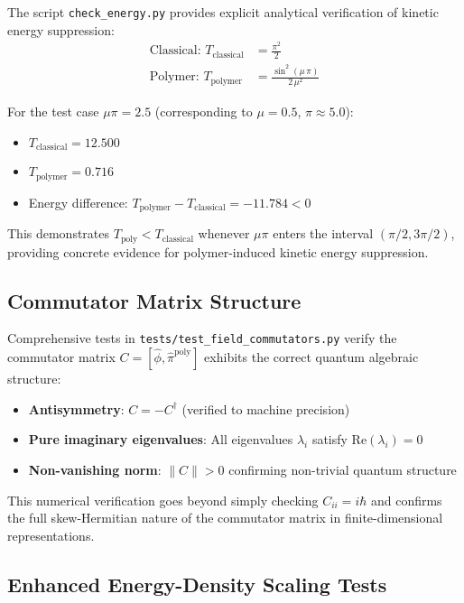 \documentclass[12pt]{article}
\begin{document}
The script \texttt{check\_energy.py} provides explicit analytical verification of kinetic energy suppression:
\begin{align}
\text{Classical: } T_{\text{classical}} &= \frac{\pi^2}{2} \\
\text{Polymer: } T_{\text{polymer}} &= \frac{\sin^2(\mu\,\pi)}{2\,\mu^2}
\end{align}

For the test case $\mu\pi = 2.5$ (corresponding to $\mu = 0.5$, $\pi \approx 5.0$):
\begin{itemize}
\item $T_{\text{classical}} = 12.500$
\item $T_{\text{polymer}} = 0.716$  
\item Energy difference: $T_{\text{polymer}} - T_{\text{classical}} = -11.784 < 0$
\end{itemize}

This demonstrates $T_{\text{poly}} < T_{\text{classical}}$ whenever $\mu\pi$ enters the interval $(\pi/2, 3\pi/2)$, providing concrete evidence for polymer-induced kinetic energy suppression.

\subsection{Commutator Matrix Structure}

Comprehensive tests in \texttt{tests/test\_field\_commutators.py} verify the commutator matrix $C = [\hat{\phi}, \hat{\pi}^{\text{poly}}]$ exhibits the correct quantum algebraic structure:
\begin{itemize}
\item \textbf{Antisymmetry}: $C = -C^{\dagger}$ (verified to machine precision)
\item \textbf{Pure imaginary eigenvalues}: All eigenvalues $\lambda_i$ satisfy $\text{Re}(\lambda_i) = 0$
\item \textbf{Non-vanishing norm}: $\|C\| > 0$ confirming non-trivial quantum structure
\end{itemize}

This numerical verification goes beyond simply checking $C_{ii} = i\hbar$ and confirms the full skew-Hermitian nature of the commutator matrix in finite-dimensional representations.

\subsection{Enhanced Energy-Density Scaling Tests}
\end{document}
